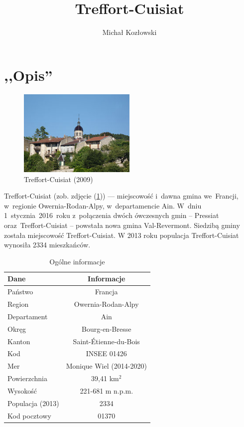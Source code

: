 \documentclass[a4paper,12pt]{article}
\title{Treffort-Cuisiat}
\author{Michał Kozłowski}
\begin{document}
\maketitle




\section{,,Opis''}

\begin{figure}
\centering
\includegraphics[width=0.5\textwidth]{grafika/obrazek.jpg}
\caption{Treffort-Cuisiat (2009)}
\label{fig:fotografia}
\end{figure}

Treffort-Cuisiat (zob. zdjęcie (\ref{fig:fotografia})) --- miejscowość i~dawna gmina we~Francji, w~regionie Owernia-Rodan-Alpy, w~departamencie Ain. W~dniu 1~stycznia~2016~roku z~połączenia dwóch ówczesnych gmin – Pressiat oraz~Treffort-Cuisiat – powstała nowa gmina Val-Revermont. Siedzibą gminy została miejscowość Treffort-Cuisiat. W 2013 roku populacja Treffort-Cuisiat wynosiła 2334 mieszkańców. 



\begin{table}
\centering
\begin{tabular}{lc}
\textbf{Dane}&\textbf{Informacje}\\
\hline
Państwo&Francja\\
Region&Owernia-Rodan-Alpy\\
Departament&Ain\\
Okręg&Bourg-en-Bresse\\
Kanton&Saint-Étienne-du-Bois\\
Kod&INSEE	01426\\
Mer&Monique Wiel (2014-2020)\\
Powierzchnia&39,41 km$^2$\\
Wysokość&221-681 m n.p.m.\\
Populacja (2013)&2334\\
Kod pocztowy&01370\\
\hline
\end{tabular}
\caption{Ogólne informacje}
\end{table}
\end{document}
